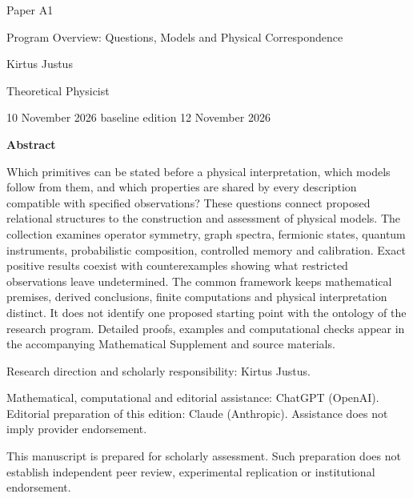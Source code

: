 \documentclass[11pt,a4paper]{article}
\begin{document}
\begin{titlepage}
{\small\sffamily \ProgramTitle\hfill Paper A1\par}
\vspace*{16mm}
{\LARGE\bfseries\raggedright{} Program Overview: Questions, Models and Physical Correspondence\par}
\vspace{11mm}
{\large Kirtus Justus\par}
\vspace{1mm}
Theoretical Physicist\par
\AuthorLocation\par
\vspace{2mm}
10 November 2026 \textperiodcentered{} baseline edition 12 November 2026\par
\vspace{11mm}
\textbf{Abstract}\par
Which primitives can be stated before a physical interpretation, which models
follow from them, and which properties are shared by every description
compatible with specified observations? These questions connect proposed
relational structures to the construction and assessment of physical models. The collection examines
operator symmetry, graph spectra, fermionic states, quantum instruments,
probabilistic composition, controlled memory and calibration. Exact positive
results coexist with counterexamples showing what restricted observations leave
undetermined. The common framework keeps mathematical premises, derived
conclusions, finite computations and physical interpretation distinct. It does
not identify one proposed starting point with the ontology of the research
program. Detailed proofs, examples and computational checks appear in the
accompanying Mathematical Supplement and source materials.\par
\vfill
{\small Research direction and scholarly responsibility: Kirtus Justus.\par
Mathematical, computational and editorial assistance: ChatGPT (OpenAI). Editorial preparation of this edition: Claude (Anthropic).
Assistance does not imply provider endorsement.\par
This manuscript is prepared for scholarly assessment. Such preparation does not establish independent peer review,
experimental replication or institutional endorsement.\par}
\end{titlepage}
\setcounter{page}{2}

\clearpage
\end{document}
